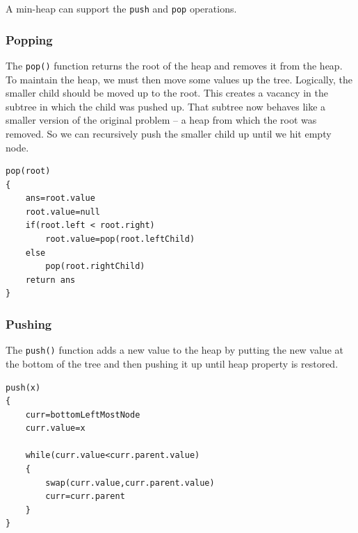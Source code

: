 A min-heap can support the \texttt{push} and \texttt{pop} operations.

\subsubsection*{Popping}
The \texttt{pop()} function returns the root of the heap and removes it from the heap. To maintain the heap, 
we must then move some values up the tree. Logically, the smaller child should be moved up to the root. 
This creates a vacancy in the subtree in which the child was pushed up. That subtree now behaves like a 
smaller version of the original problem -- a heap from which the root was removed. So we can recursively 
push the smaller child up until we hit empty node.

\begin{center}
\begin{minipage}{0.9\linewidth}
\begin{framed}
\begin{Verbatim}
pop(root)
{
	ans=root.value
	root.value=null
	if(root.left < root.right)
		root.value=pop(root.leftChild)
	else
		pop(root.rightChild)
	return ans
}
\end{Verbatim}
\vspace{-4mm}
\end{framed}
\end{minipage}
\end{center}

\subsubsection*{Pushing}

The \texttt{push()} function adds a new value to the heap by putting the new value at the 
bottom of the tree and then pushing it up until heap property is restored. 

\begin{center}
\begin{minipage}{0.9\linewidth}
\begin{framed}
\begin{Verbatim}
push(x)
{
	curr=bottomLeftMostNode
	curr.value=x

	while(curr.value<curr.parent.value)
	{
		swap(curr.value,curr.parent.value)
		curr=curr.parent
	}
}
\end{Verbatim}
\vspace{-4mm}
\end{framed}
\end{minipage}
\end{center}

